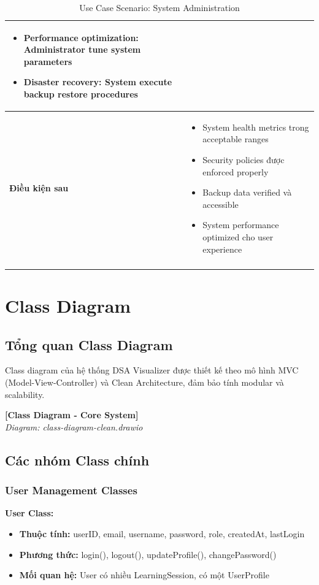 \begin{longtable}{|p{4cm}|p{10cm}|}
\begin{itemize}
    \item Performance optimization: Administrator tune system parameters
    \item Disaster recovery: System execute backup restore procedures
\end{itemize} \\ \hline
\textbf{Điều kiện sau} & 
\begin{itemize}
    \item System health metrics trong acceptable ranges
    \item Security policies được enforced properly
    \item Backup data verified và accessible
    \item System performance optimized cho user experience
\end{itemize} \\ \hline
\caption{Use Case Scenario: System Administration}
\label{tab:uc010} \\
\end{longtable}

\section{Class Diagram}
\label{sec:class-diagram}

\subsection{Tổng quan Class Diagram}
\label{subsec:class-overview}

Class diagram của hệ thống DSA Visualizer được thiết kế theo mô hình MVC (Model-View-Controller) và Clean Architecture, đảm bảo tính modular và scalability.

\begin{center}
\textbf{[Class Diagram - Core System]}\\
\textit{Diagram: class-diagram-clean.drawio}
\end{center}

\subsection{Các nhóm Class chính}

\subsubsection{User Management Classes}

\textbf{User Class:}
\begin{itemize}
    \item \textbf{Thuộc tính:} userID, email, username, password, role, createdAt, lastLogin
    \item \textbf{Phương thức:} login(), logout(), updateProfile(), changePassword()
    \item \textbf{Mối quan hệ:} User có nhiều LearningSession, có một UserProfile
\end{itemize}

